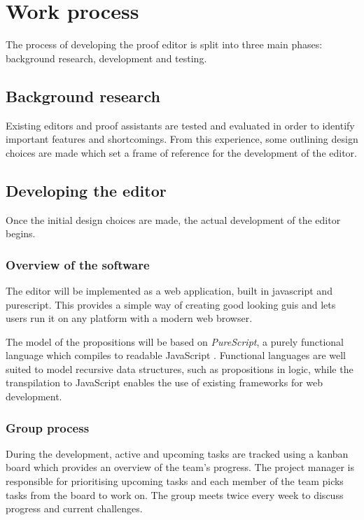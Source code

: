 \section{Work process}
The process of developing the proof editor is split into three main phases:
background research, development and testing.

\subsection{Background research}
Existing editors and proof assistants are tested and evaluated in order to identify important features and shortcomings. From this experience, some outlining design choices are made which set a frame of reference for the development of the editor.

\subsection{Developing the editor}

Once the initial design choices are made, the actual development of the editor begins.

\subsubsection{Overview of the software}
The editor will be implemented as a web application, built in \gls{javascript} and \gls{purescript}. This provides a simple way of creating good looking \glspl{gui} and lets users run it on any platform with a modern web browser.

The model of the propositions will be based on \emph{PureScript}, a purely functional language which compiles to readable JavaScript \cite{purescript}. Functional languages are well suited to model recursive data structures, such as propositions in logic, while the \gls{transpilation} to JavaScript enables the use of existing frameworks for web development.

\subsubsection{Group process}
During the development, active and upcoming tasks are tracked using a \Gls{kanban} board which provides an overview of the team's progress. The project manager is responsible for prioritising upcoming tasks and each member of the team picks tasks from the board to work on. The group meets twice every week to discuss progress and current challenges.

